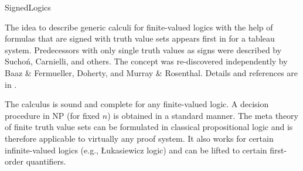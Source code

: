 \begin{entry}{SignedLogics}
\begin{clarifications}
\end{clarifications}

\begin{history}
  The idea to describe generic calculi for finite-valued logics with
  the help of formulas that are signed with truth value sets appears
  first in \cite{Haehnle90} for a tableau system. Predecessors with
  only single truth values as signs were described by Sucho\'n,
  Carnielli, and others. The concept was re-discovered independently
  by Baaz \& Fermueller, Doherty, and Murray \& Rosenthal.  Details
  and references are in \cite{BFS01,Haehnle01}.
\end{history}

\begin{technicalities}
  The calculus is sound and complete for any finite-valued logic. A
  decision procedure in NP (for fixed $n$) is obtained in a standard
  manner.  The meta theory of finite truth value sets can be
  formulated in classical propositional logic and is therefore
  applicable to virtually any proof system. It also works for certain
  infinite-valued logics (e.g., {\L}ukasiewicz logic) and can be
  lifted to certain first-order quantifiers.
\end{technicalities}



%
%
%
%
%
%
% 
%




\end{entry}
